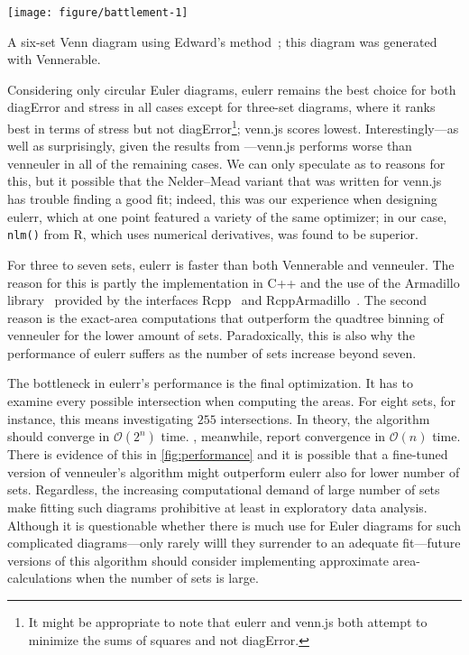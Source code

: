 \documentclass[
  oneside,
  openany,
  numbers=noendperiod,
  parskip=half,
  bibliography=totoc
]{scrbook}\usepackage[]{graphicx}\usepackage{xcolor}
\newenvironment{knitrout}{}{} %
\newcommand{\pkg}[1]{{\fontseries{b}\selectfont #1}}
\newcommand{\code}[1]{\texttt{#1}}
\begin{document}
\begin{marginfigure}
\begin{knitrout}\small
{}\color{fgcolor}

{\centering \texttt{[image: figure/battlement-1]}

}



\end{knitrout}
\caption{A six-set Venn diagram using Edward's method~\cite{Edwards_2014};
this diagram was generated with \pkg{Vennerable}.}
\label{fig:edwards}
\end{marginfigure}

Considering only circular Euler diagrams, \pkg{eulerr} remains the best
choice for both diagError and stress in all cases except for three-set
diagrams, where it ranks best in terms of stress but not diagError\footnote{
It might be appropriate to note that \pkg{eulerr} and \pkg{venn.js} both
attempt to minimize the sums of squares and not diagError.}; \pkg{venn.js}
scores lowest. Interestingly---as well as surprisingly, given the results
from ---\pkg{venn.js} performs worse than \pkg{venneuler}
in all of the remaining cases. We can only speculate as to reasons for this,
but it possible that the Nelder--Mead variant that was written for \pkg{venn.js}
has trouble finding a good fit; indeed, this was our experience when designing
\pkg{eulerr}, which at one point featured a variety of the same optimizer; in our case,
\code{nlm()} from R, which uses numerical derivatives, was
found to be superior.

For three to seven sets, \pkg{eulerr} is faster than both \pkg{Vennerable} and
\pkg{venneuler}. The reason for this is partly the implementation
in C++ and the use of the Armadillo library~\citep{Sanderson_2016} provided by the interfaces
\pkg{Rcpp}~\citep{Eddelbuettel_2011} and \pkg{RcppArmadillo}~\citep{Eddelbuettel_2014}.
The second reason is the exact-area computations that outperform the
quadtree binning of \pkg{venneuler} for the lower amount of sets.
Paradoxically, this is also why the performance of \pkg{eulerr}
suffers as the number of sets increase beyond seven.

The bottleneck in \pkg{eulerr}'s performance is the final
optimization. It has to examine every possible intersection when computing the
areas. For eight sets, for instance, this means investigating $255$
intersections. In theory, the
algorithm should converge in $\mathcal{O}(2^n)$ time. \citet{Wilkinson_2012},
meanwhile, report convergence in $\mathcal{O}(n)$ time. There is evidence
of this in \cref{fig:performance} and it is possible that a fine-tuned
version of \pkg{venneuler}'s algorithm might outperform \pkg{eulerr} also
for lower number of sets. Regardless, the increasing computational demand
of large number of sets make fitting such diagrams prohibitive at least in
exploratory data analysis. Although it is questionable whether there is much
use for Euler diagrams for such complicated diagrams---only rarely willl they
surrender to an adequate fit---future versions of this algorithm should
consider implementing approximate area-calculations when the number of sets is
large.
\end{document}

